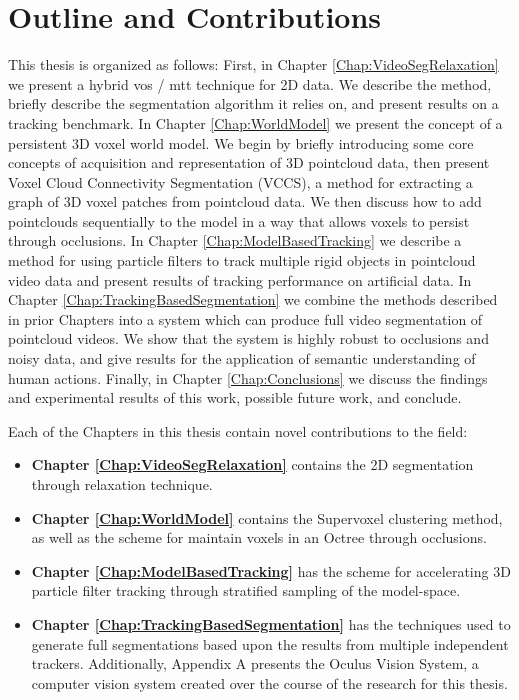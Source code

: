 
\section{Outline and Contributions}

This thesis is organized as follows: First, in Chapter \ref{Chap:VideoSegRelaxation} we present a hybrid \gls{vos} / \gls{mtt} technique for 2D data. We describe the method, briefly describe the segmentation algorithm it relies on, and present results on a tracking benchmark. In Chapter \ref{Chap:WorldModel} we present the concept of a persistent 3D voxel world model. We begin by briefly introducing some core concepts of acquisition and representation of 3D pointcloud data, then present Voxel Cloud Connectivity Segmentation (VCCS), a method for extracting a graph of 3D voxel patches from pointcloud data. We then discuss how to add pointclouds sequentially to the model in a way that allows voxels to persist through occlusions. In Chapter \ref{Chap:ModelBasedTracking} we describe a method for using particle filters to track multiple rigid objects in pointcloud video data and present results of tracking performance on artificial data. In Chapter \ref{Chap:TrackingBasedSegmentation} we combine the methods described in prior Chapters into a system which can produce full video segmentation of pointcloud videos. We show that the system is highly robust to occlusions and noisy data, and give results for the application of semantic understanding of human actions. Finally, in Chapter \ref{Chap:Conclusions} we discuss the findings and experimental results of this work, possible future work, and conclude.

Each of the Chapters in this thesis contain novel contributions to the field: 
\begin{itemize}
\item {\bf Chapter \ref{Chap:VideoSegRelaxation} } contains the 2D segmentation through relaxation technique. 

\item {\bf Chapter \ref{Chap:WorldModel} } contains the Supervoxel clustering method, as well as the scheme for maintain voxels in an Octree through occlusions. 

\item {\bf Chapter \ref{Chap:ModelBasedTracking} } has the scheme for accelerating 3D particle filter tracking through stratified sampling of the model-space. 

\item {\bf Chapter \ref{Chap:TrackingBasedSegmentation} } has the techniques used to generate full segmentations based upon the results from multiple independent trackers. Additionally, Appendix A presents the Oculus Vision System, a computer vision system created over the course of the research for this thesis.
\end{itemize}
